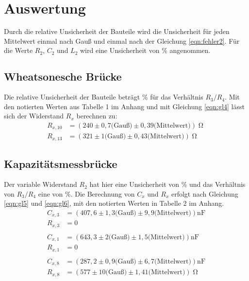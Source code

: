 \section{Auswertung}
\label{sec:Auswertung}

Durch die relative Unsicherheit der Bauteile wird die Unsicherheit für jeden Mittelwert einmal nach Gauß und einmal nach der Gleichung \eqref{eqn:fehler2}.
Für die Werte $R_2$, $C_2$ und $L_2$ wird eine Unsicherheit von \% angenommen.

\subsection{Wheatsonesche Brücke}
\label{sec:Weed}
Die relative Unsicherheit der Bauteile beträgt \% für das Verhältnis $R_3/R_4$.
Mit den notierten Werten aus Tabelle 1 im Anhang und mit Gleichung \eqref{eqn:gl4} lässt sich der Widerstand $R_x$ berechnen zu:
\begin{align*}
  R_{x,10} &= (240 \pm 0,7 \textrm{(Gauß)} \pm 0,39 \textrm{(Mittelwert)}) \upOmega \\
  R_{x,13} &= (321 \pm 1 \textrm{(Gauß)} \pm 0,43 \textrm{(Mittelwert)}) \upOmega
\end{align*}

\subsection{Kapazitätsmessbrücke}
\label{sec:Kapazitaet}
Der variable Widerstand $R_2$ hat hier eine Unsicherheit von \% und das Verhältnis von $R_3/R_4$ eine von \%.
Die Berechnung von $C_x$ und $R_x$ erfolgt nach Gleichung \eqref{eqn:gl5} und \eqref{eqn:gl6}, mit den notierten Werten in Tabelle 2 im Anhang.
\begin{align*}
  C_{x,3} &= (407,6 \pm 1,3 \textrm{(Gauß)} \pm 9,9 \textrm{(Mittelwert)}) \textrm{nF} \\
  R_{x,3} &= 0\\
  \\
  C_{x,1} &= (643,3 \pm 2 \textrm{(Gauß)} \pm 1,5 \textrm{(Mittelwert)}) \textrm{nF} \\
  R_{x,1} &= 0\\
  \\
  C_{x,8} &= (287,2 \pm 0,9 \textrm{(Gauß)} \pm 6,7 \textrm{(Mittelwert)}) \textrm{nF} \\
  R_{x,8} &= (577 \pm 10 \textrm{(Gauß)} \pm 1,41 \textrm{(Mittelwert)}) \upOmega
\end{align*}

